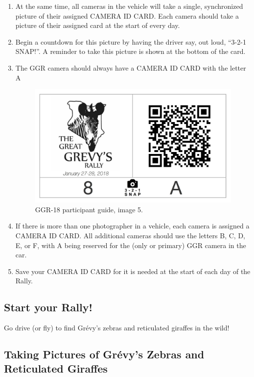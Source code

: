 \begin{enumerate}
    \item At the same time, all cameras in the vehicle will take a single, synchronized picture of their assigned CAMERA ID CARD.  Each camera should take a picture of their assigned card at the start of every day.
    \item Begin a countdown for this picture by having the driver say, out loud, ``3-2-1 SNAP!''.  A reminder to take this picture is shown at the bottom of the card.
    \item The GGR camera should always have a CAMERA ID CARD with the letter A

          \begin{figure}[H]
              \begin{center}
                  \includegraphics[width=0.8\linewidth]{resources/guide4.pdf}
              \end{center}
              \caption{GGR-18 participant guide, image 5.}
          \end{figure}

    \item If there is more than one photographer in a vehicle, each camera is assigned a CAMERA ID CARD.  All additional cameras should use the letters B, C, D, E, or F, with A being reserved for the (only or primary) GGR camera in the car.
    \item Save your CAMERA ID CARD for it is needed at the start of each day of the Rally.
\end{enumerate}

\subsection{Start your Rally!}
Go drive (or fly) to find Gr\'evy's zebras and reticulated giraffes in the wild!

\subsection{Taking Pictures of Gr\'evy's Zebras and Reticulated Giraffes}

